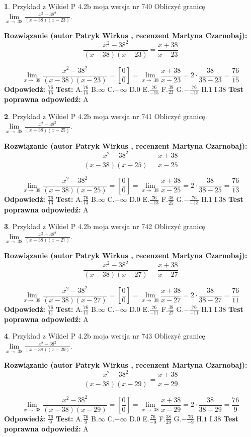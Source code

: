 \documentclass[12pt, a4paper]{article}
\theoremstyle{definition} %
\newtheorem{zad}{}
\newcommand{\zadStart}[1]{\begin{zad}#1\newline}
\newcommand{\zadStop}{\end{zad}}
\newcommand{\rozwStart}[2]{\noindent \textbf{Rozwiązanie (autor #1 , recenzent #2): }\newline}
\newcommand{\rozwStop}{\newline}
\newcommand{\odpStart}{\noindent \textbf{Odpowiedź:}\newline}
\newcommand{\odpStop}{\newline}
\newcommand{\testStart}{\noindent \textbf{Test:}\newline}
\newcommand{\testStop}{\newline}
\newcommand{\kluczStart}{\noindent \textbf{Test poprawna odpowiedź:}\newline}
\newcommand{\kluczStop}{\newline}
\begin{document}
\zadStart{Przykład z Wikieł P 4.2b moja wersja nr 740}
Obliczyć granicę $\lim\limits_{x\to\ 38}\frac{x^{2}-38^{2}}{(x-38)(x-23)}$.
\zadStop
\rozwStart{Patryk Wirkus}{Martyna Czarnobaj}
$$\frac{x^{2}-38^{2}}{(x-38)(x-23)}=\frac{x+38}{x-23}$$

$$\lim\limits_{x\to\ 38}\frac{x^{2}-38^{2}}{(x-38)(x-23)}=[\frac{0}{0}]=\lim\limits_{x\to\ 38}\frac{x+38}{x-23}=2 \cdot \frac{38}{38-23} = \frac{76}{15}$$
\rozwStop
\odpStart
$\frac{76}{15}$
\odpStop
\testStart
A.$\frac{76}{15}$
B.$\infty$
C.$-\infty$
D.$0$
E.$\frac{76}{-15}$
F.$\frac{38}{23}$
G.$-\frac{76}{-15}$
H.$1$
I.$38$
\testStop
\kluczStart
A
\kluczStop



\zadStart{Przykład z Wikieł P 4.2b moja wersja nr 741}
Obliczyć granicę $\lim\limits_{x\to\ 38}\frac{x^{2}-38^{2}}{(x-38)(x-25)}$.
\zadStop
\rozwStart{Patryk Wirkus}{Martyna Czarnobaj}
$$\frac{x^{2}-38^{2}}{(x-38)(x-25)}=\frac{x+38}{x-25}$$

$$\lim\limits_{x\to\ 38}\frac{x^{2}-38^{2}}{(x-38)(x-25)}=[\frac{0}{0}]=\lim\limits_{x\to\ 38}\frac{x+38}{x-25}=2 \cdot \frac{38}{38-25} = \frac{76}{13}$$
\rozwStop
\odpStart
$\frac{76}{13}$
\odpStop
\testStart
A.$\frac{76}{13}$
B.$\infty$
C.$-\infty$
D.$0$
E.$\frac{76}{-13}$
F.$\frac{38}{25}$
G.$-\frac{76}{-13}$
H.$1$
I.$38$
\testStop
\kluczStart
A
\kluczStop



\zadStart{Przykład z Wikieł P 4.2b moja wersja nr 742}
Obliczyć granicę $\lim\limits_{x\to\ 38}\frac{x^{2}-38^{2}}{(x-38)(x-27)}$.
\zadStop
\rozwStart{Patryk Wirkus}{Martyna Czarnobaj}
$$\frac{x^{2}-38^{2}}{(x-38)(x-27)}=\frac{x+38}{x-27}$$

$$\lim\limits_{x\to\ 38}\frac{x^{2}-38^{2}}{(x-38)(x-27)}=[\frac{0}{0}]=\lim\limits_{x\to\ 38}\frac{x+38}{x-27}=2 \cdot \frac{38}{38-27} = \frac{76}{11}$$
\rozwStop
\odpStart
$\frac{76}{11}$
\odpStop
\testStart
A.$\frac{76}{11}$
B.$\infty$
C.$-\infty$
D.$0$
E.$\frac{76}{-11}$
F.$\frac{38}{27}$
G.$-\frac{76}{-11}$
H.$1$
I.$38$
\testStop
\kluczStart
A
\kluczStop



\zadStart{Przykład z Wikieł P 4.2b moja wersja nr 743}
Obliczyć granicę $\lim\limits_{x\to\ 38}\frac{x^{2}-38^{2}}{(x-38)(x-29)}$.
\zadStop
\rozwStart{Patryk Wirkus}{Martyna Czarnobaj}
$$\frac{x^{2}-38^{2}}{(x-38)(x-29)}=\frac{x+38}{x-29}$$

$$\lim\limits_{x\to\ 38}\frac{x^{2}-38^{2}}{(x-38)(x-29)}=[\frac{0}{0}]=\lim\limits_{x\to\ 38}\frac{x+38}{x-29}=2 \cdot \frac{38}{38-29} = \frac{76}{9}$$
\rozwStop
\odpStart
$\frac{76}{9}$
\odpStop
\testStart
A.$\frac{76}{9}$
B.$\infty$
C.$-\infty$
D.$0$
E.$\frac{76}{-9}$
F.$\frac{38}{29}$
G.$-\frac{76}{-9}$
H.$1$
I.$38$
\testStop
\kluczStart
A
\kluczStop
\end{document}
